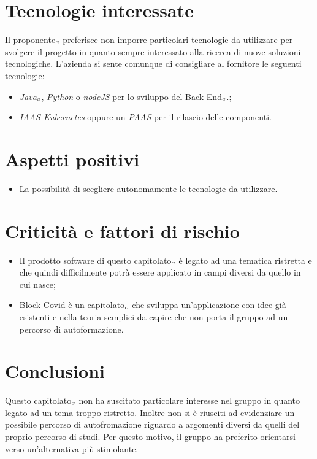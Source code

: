 \section{Tecnologie interessate} \label{C1TecnologieInteressate}
Il proponente$_{\scaleto{G}{3pt}}$ preferisce non imporre particolari tecnologie da utilizzare per svolgere il progetto in quanto sempre interessato alla ricerca di nuove soluzioni tecnologiche. L'azienda si sente comunque di consigliare al fornitore le seguenti tecnologie: 
\begin{itemize}
	\item \textit{Java}$_{\scaleto{G}{3pt}}$, \textit{Python} o \textit{nodeJS} per lo sviluppo del Back-End$_{\scaleto{G}{3pt}}$.;
	\item \textit{IAAS Kubernetes} oppure un \textit{PAAS} per il rilascio delle componenti.
\end{itemize}
\section{Aspetti positivi} \label{C1AspettiPositivi}
\begin{itemize}
	\item La possibilità di scegliere autonomamente le tecnologie da utilizzare.
\end{itemize}
\section{Criticità e fattori di rischio} \label{C1CriticitàEFattoriDiRischio}
\begin{itemize}
	\item Il prodotto software di questo capitolato$_{\scaleto{G}{3pt}}$ è legato ad una tematica ristretta e che quindi difficilmente potrà essere applicato in campi diversi da quello in cui nasce;
	\item Block Covid è un capitolato$_{\scaleto{G}{3pt}}$ che sviluppa un'applicazione con idee già esistenti e nella teoria semplici da capire che non porta il gruppo ad un percorso di autoformazione.
\end{itemize}
\section{Conclusioni} \label{C1Conclusioni}
Questo capitolato$_{\scaleto{G}{3pt}}$ non ha suscitato particolare interesse nel gruppo in quanto legato ad un tema troppo ristretto. Inoltre non si è riusciti ad evidenziare un possibile percorso di autofromazione riguardo a argomenti diversi da quelli del proprio percorso di studi. Per questo motivo, il gruppo ha preferito orientarsi verso un'alternativa più stimolante.